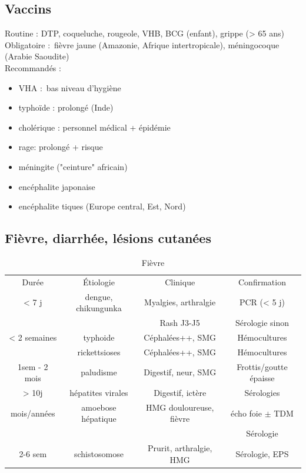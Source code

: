 \documentclass{article}
\begin{document}
\subsection{Vaccins}%
Routine : DTP, coqueluche, rougeole, VHB, BCG (enfant), grippe (> 65 ans)\\
Obligatoire : fièvre jaune (Amazonie, Afrique intertropicale), méningocoque
(Arabie Saoudite)\\
Recommandés :
\begin{itemize}
  \item VHA : bas niveau d'hygiène
  \item typhoïde : prolongé (Inde)
  \item cholérique : personnel médical + épidémie
  \item rage: prolongé + risque
  \item méningite ("ceinture" africain)
  \item encéphalite japonaise
  \item encéphalite tiques (Europe central, Est, Nord)
\end{itemize}

\subsection{Fièvre, diarrhée, lésions cutanées}
\begin{table}[htpb]
  \centering
  \caption{Fièvre}
  \begin{tabular}{*{4}{c}}
  \toprule
  Durée        & Étiologie           & Clinique                & Confirmation \\
  < 7 j        & dengue, chikungunka & Myalgies, arthralgie    & PCR (< 5 j)\\
               &                     & Rash J3-J5              & Sérologie sinon\\
  \midrule
  < 2 semaines & typhoide            & Céphalées++, SMG        & Hémocultures\\
               & rickettsioses       & Céphalées++, SMG        & Hémocultures\\
  \midrule
  1sem - 2 mois& paludisme          & Digestif, neur, SMG     & Frottis/goutte épaisse\\
  > 10j        & hépatites virales  & Digestif, ictère        & Sérologies \\
  mois/années  & amoebose hépatique & HMG douloureuse, fièvre & écho foie $\pm$ TDM\\
               &                    &                         & Sérologie\\
  2-6 sem      & schistosomose      & Prurit, arthralgie, HMG & Sérologie, EPS\\
  \bottomrule
  \end{tabular}
\end{table}
\end{document}
